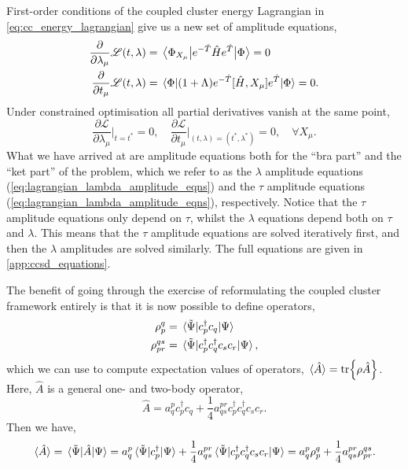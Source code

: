 First-order conditions of the coupled cluster energy Lagrangian in
\autoref{eq:cc_energy_lagrangian} give us a new set of amplitude equations,
\begin{align}
    \label{eq:lagrangian_tau_amplitude_eqns}
    \frac{\partial}{\partial \lambda_\mu} \mathscr{L}(t, \lambda)
    &= \mel{\Phi_{X_\mu}}{e^{-\hat{T}}\hat{H}e^{\hat{T}} }{\Phi} = 0 \\
    \label{eq:lagrangian_lambda_amplitude_eqns} 
    \frac{\partial}{\partial t_\mu} \mathscr{L}(t, \lambda)
    &= \mel{\Phi}{(1 + \Lambda)e^{-\hat{T}}[\hat{H}, X_\mu]e^{\hat{T}} }{\Phi} = 0.
\end{align}
Under constrained optimisation all partial derivatives vanish at the same point,
\begin{equation}
    \frac{\partial \mathscr{L}}{\partial \lambda_\mu}\Big\lvert_{t=t^*} = 0,
    \quad
    \frac{\partial \mathscr{L}}{\partial t_\mu}\Big\lvert_{(t,\lambda)=(t^*,\lambda^*)} = 0,
    \quad \forall X_\mu.
\end{equation}
What we have arrived at are amplitude equations both for the ``bra part'' and the 
``ket part'' of the problem, which we refer to as the $\lambda$ amplitude equations
(\autoref{eq:lagrangian_lambda_amplitude_eqns}) and 
the $\tau$ amplitude equations
(\autoref{eq:lagrangian_lambda_amplitude_eqns}), respectively. Notice that the $\tau$ amplitude equations 
only depend on $\tau$, whilst the $\lambda$ equations depend both on $\tau$ and $\lambda$.
This means that the $\tau$ amplitude equations are solved iteratively first, and then 
the $\lambda$ amplitudes are solved similarly.
The full equations are given in \autoref{app:ccsd_equations}.

The benefit of going through the exercise of reformulating the coupled cluster framework entirely
is that it is now possible to define operators,
\begin{align}
    \rho^q_p &= \mel*{\tilde{\Psi}}{c^\dagger_p c_q}{\Psi} \\
    \rho^{qs}_{pr} &= \mel*{\tilde{\Psi}}{c^\dagger_p c^\dagger_q c_s c_r}{\Psi},
\end{align}
which we can use to compute expectation values of operators,
$\ev*{\hat{A}} = \tr{\rho\hat{A}}$. Here, $\hat{A}$ is a general one- and two-body 
operator,
\begin{equation}
    \hat{A} = 
        a^p_qc^\dagger_p c_q 
        + \frac{1}{4}a^{pr}_{qs}c^\dagger_p c^\dagger_q c_s c_r.
\end{equation}
Then we have,
\begin{equation}
    \ev*{\hat{A}} = \mel*{\tilde{\Psi}}{\hat{A}}{\Psi}
        = a^p_q \mel*{\tilde{\Psi}}{c^\dagger_p}{\Psi}
        + \frac{1}{4} a^{pr}_{qs}
            \mel*{\tilde{\Psi}}{c^\dagger_p c^\dagger_q c_s c_r}{\Psi}
        = a^p_q \rho^q_p + \frac{1}{4} a^{pr}_{qs} \rho^{qs}_{pr}.
\end{equation}

